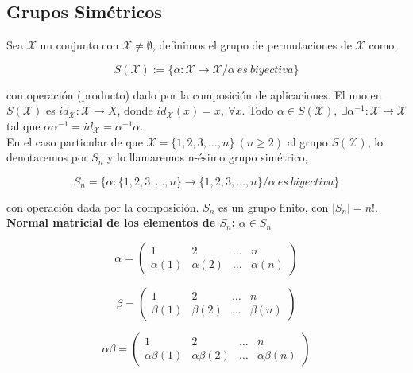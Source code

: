 \documentclass{article}
\begin{document}
\subsection{Grupos Simétricos}
Sea $\mathcal{X}$ un conjunto con $\mathcal{X}\neq \emptyset$, definimos el grupo de permutaciones de $\mathcal{X}$ como, 

\begin{equation*}
S(\mathcal{X}):=\{\alpha:\mathcal{X}\rightarrow \mathcal{X}/\alpha~es~biyectiva\}
\end{equation*}

con operación (producto) dado por la composición de aplicaciones. El uno en $S(\mathcal{X})$ es $id_{\mathcal{X}}:\mathcal{X}\rightarrow X$, donde $id_\mathcal{X}(x)=x,~\forall x$. Todo $\alpha \in S(\mathcal{X}),~ \exists \alpha^{-1}:\mathcal{X}\rightarrow \mathcal{X}$ tal que $\alpha \alpha^{-1}=id_\mathcal{X}=\alpha^{-1}\alpha$. \\

En el caso particular de que $\mathcal{X}=\{1,2,3,\ldots,n\}~(n\geq 2)$ al grupo $S(\mathcal{X})$, lo denotaremos por $S_n$ y lo llamaremos n-ésimo grupo simétrico,

\begin{equation*}
S_n=\{\alpha:\{1,2,3,\ldots,n\}\rightarrow \{1,2,3,\ldots,n\}/\alpha~es~biyectiva\}
\end{equation*}

con operación dada por la composición. $S_n$ es un grupo finito, con $|S_n|=n!$. \\

\textbf{Normal matricial de los elementos de $S_n$:} $\alpha \in S_n$

\begin{equation*}
\alpha =
\begin{pmatrix}
1 & 2 & \ldots & n \\
\alpha(1) & \alpha(2) & \ldots & \alpha(n)
\end{pmatrix}
\end{equation*}

\begin{equation*}
\beta=
\begin{pmatrix}
1 & 2 &\ldots &n \\
\beta(1) & \beta(2) & \ldots & \beta(n)
\end{pmatrix}
\end{equation*}

\begin{equation*}
\alpha\beta=
\begin{pmatrix}
1 & 2 &\ldots &n \\
\alpha\beta(1) & \alpha\beta(2) & \ldots & \alpha\beta(n)
\end{pmatrix}
\end{equation*}
\end{document}
